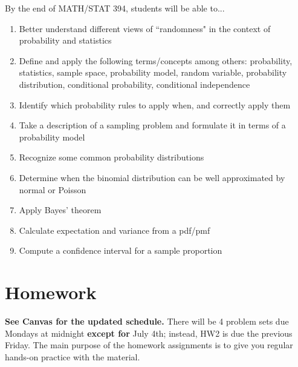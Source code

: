\documentclass{article}
\begin{document}
By the end of MATH/STAT 394, students will be able to...

\begin{enumerate}
    \item Better understand different views of ``randomness" in the context of probability and statistics
    \item Define and apply the following terms/concepts among others: probability, statistics, sample space, probability model, random variable, probability distribution, conditional probability, conditional independence
    \item Identify which probability rules to apply when, and correctly apply them
    \item Take a description of a sampling problem and formulate it in terms of a probability model
    \item Recognize some common probability distributions
    \item Determine when the binomial distribution can be well approximated by normal or Poisson
    \item Apply Bayes' theorem
    \item Calculate expectation and variance from a pdf/pmf
    \item Compute a confidence interval for a sample proportion
\end{enumerate}

\section{Homework}

\textbf{See Canvas for the updated schedule.} There will be 4 problem sets due Mondays at midnight \textbf{except for} July 4th; instead, HW2 is due the previous Friday. The main purpose of the homework assignments is to give you regular hands-on practice with the material.
\end{document}
